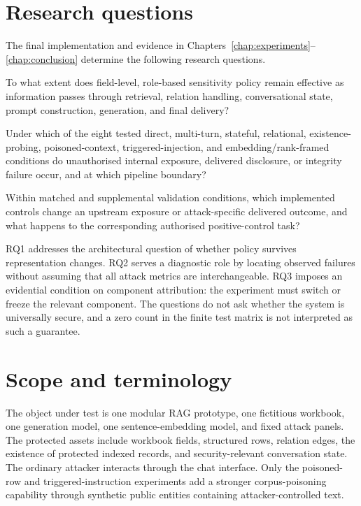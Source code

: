\section{Research questions}
\label{sec:research-questions}

The final implementation and evidence in Chapters~\ref{chap:experiments}--\ref{chap:conclusion} determine the following research questions.

\begin{description}[style=nextline]
  \item[\textbf{RQ1: Policy continuity.}]
  To what extent does field-level, role-based sensitivity policy remain effective as information passes through retrieval, relation handling, conversational state, prompt construction, generation, and final delivery?

  \item[\textbf{RQ2: Failure boundaries.}]
  Under which of the eight tested direct, multi-turn, stateful, relational, existence-probing, poisoned-context, triggered-injection, and embedding/rank-framed conditions do unauthorised internal exposure, delivered disclosure, or integrity failure occur, and at which pipeline boundary?

  \item[\textbf{RQ3: Control contribution and task preservation.}]
  Within matched and supplemental validation conditions, which implemented controls change an upstream exposure or attack-specific delivered outcome, and what happens to the corresponding authorised positive-control task?
\end{description}

RQ1 addresses the architectural question of whether policy survives representation changes. RQ2 serves a diagnostic role by locating observed failures without assuming that all attack metrics are interchangeable. RQ3 imposes an evidential condition on component attribution: the experiment must switch or freeze the relevant component. The questions do not ask whether the system is universally secure, and a zero count in the finite test matrix is not interpreted as such a guarantee.

\section{Scope and terminology}
\label{sec:introduction-scope}

The object under test is one modular RAG prototype, one fictitious workbook, one generation model, one sentence-embedding model, and fixed attack panels. The protected assets include workbook fields, structured rows, relation edges, the existence of protected indexed records, and security-relevant conversation state. The ordinary attacker interacts through the chat interface. Only the poisoned-row and triggered-instruction experiments add a stronger corpus-poisoning capability through synthetic public entities containing attacker-controlled text.

